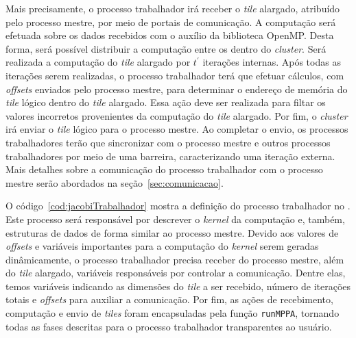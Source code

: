 Mais precisamente, o processo trabalhador irá receber o \textit{tile}
alargado, atribuído pelo processo mestre, por meio de portais de comunicação.
A computação será efetuada sobre os dados recebidos com o auxílio da biblioteca
OpenMP. Desta forma, será possível distribuir a computação entre os \pes dentro
do \textit{cluster}. Será realizada a computação do \textit{tile} alargado por
$t^\prime$ iterações internas. Após todas as iterações serem realizadas, o
processo trabalhador terá que efetuar cálculos, com \textit{offsets} enviados
pelo processo mestre, para determinar o endereço de memória do \textit{tile}
lógico dentro do \textit{tile} alargado. Essa ação deve ser realizada para
filtar os valores incorretos provenientes da computação do \textit{tile}
alargado. Por fim, o \textit{cluster} irá enviar o \textit{tile} lógico para o
processo mestre. Ao completar o envio, os processos trabalhadores terão que
sincronizar com o processo mestre e outros processos trabalhadores por meio de
uma barreira, caracterizando uma iteração externa. Mais detalhes sobre a
comunicação do processo trabalhador com o processo mestre serão abordados na
seção~\ref{sec:comunicacao}.


%
O código~\ref{cod:jacobiTrabalhador} mostra a definição do processo trabalhador
no \mppa. Este processo será responsável por descrever o \textit{kernel} da
computação e, também, estruturas de dados de forma similar ao processo mestre.
Devido aos valores de \textit{offsets} e variáveis importantes para a computação
do \textit{kernel} serem geradas dinâmicamente, o processo trabalhador precisa
receber do processo mestre, além do \textit{tile} alargado, variáveis
responsáveis por controlar a comunicação. Dentre elas, temos variáveis indicando
as dimensões do \textit{tile} a ser recebido, número de iterações totais e
\textit{offsets} para auxiliar a comunicação. Por fim, as ações de recebimento,
computação e envio de \textit{tiles} foram encapsuladas pela função
\texttt{runMPPA}, tornando todas as fases descritas para o processo
trabalhador transparentes ao usuário.


